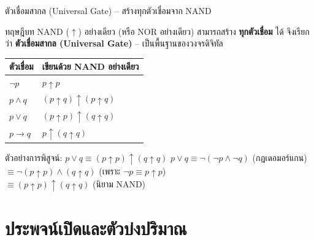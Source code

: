 \begin{frame}{ตัวเชื่อมสากล (Universal Gate) -- สร้างทุกตัวเชื่อมจาก NAND}
  \begin{block}{ทฤษฎีบท}
    NAND ($\uparrow$) อย่างเดียว (หรือ NOR อย่างเดียว) สามารถสร้าง \textbf{ทุกตัวเชื่อม} ได้
    จึงเรียกว่า \textbf{ตัวเชื่อมสากล (Universal Gate)} -- เป็นพื้นฐานของวงจรดิจิทัล
  \end{block}
  \vspace{0.3em}
  \begin{center}
  \begin{tabular}{|l|l|}
    \hline
    \textbf{ตัวเชื่อม} & \textbf{เขียนด้วย NAND อย่างเดียว} \\ \hline
    $\neg p$ & $p \uparrow p$ \\ \hline
    $p \land q$ & $(p \uparrow q) \uparrow (p \uparrow q)$ \\ \hline
    $p \lor q$ & $(p \uparrow p) \uparrow (q \uparrow q)$ \\ \hline
    $p \rightarrow q$ & $p \uparrow (q \uparrow q)$ \\ \hline
  \end{tabular}
  \end{center}
  \vspace{0.4em}
  \begin{exampleblock}{ตัวอย่างการพิสูจน์: $p \lor q \equiv (p \uparrow p) \uparrow (q \uparrow q)$}
    \footnotesize
    $p \lor q \equiv \neg(\neg p \land \neg q)$ \quad (กฎเดอมอร์แกน) \\
    $\equiv \neg(p \uparrow p) \land (q \uparrow q)$ \quad (เพราะ $\neg p \equiv p \uparrow p$) \\
    $\equiv (p \uparrow p) \uparrow (q \uparrow q)$ \quad (นิยาม NAND)
  \end{exampleblock}
\end{frame}


\section{ประพจน์เปิดและตัวบ่งปริมาณ}

